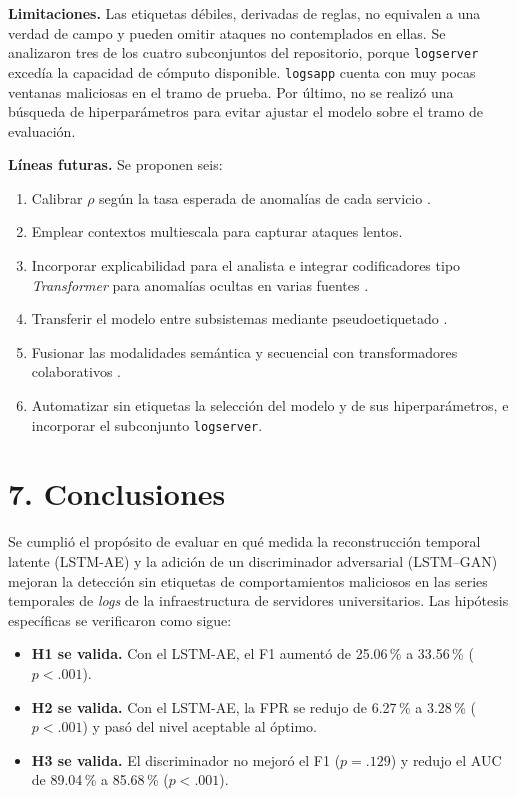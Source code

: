 \documentclass[jou,a4paper,floatsintext,donotrepeattitle]{apa7}
\begin{document}
\textbf{Limitaciones.} Las etiquetas débiles, derivadas de reglas, no equivalen a una verdad de campo y pueden omitir ataques no contemplados en ellas. Se analizaron tres de los cuatro subconjuntos del repositorio, porque \texttt{logserver} excedía la capacidad de cómputo disponible. \texttt{logsapp} cuenta con muy pocas ventanas maliciosas en el tramo de prueba. Por último, no se realizó una búsqueda de hiperparámetros para evitar ajustar el modelo sobre el tramo de evaluación.

\textbf{Líneas futuras.} Se proponen seis:
\begin{enumerate}
  \item Calibrar $\rho$ según la tasa esperada de anomalías de cada servicio \parencite{qian2025,yokkampon2022}.
  \item Emplear contextos multiescala para capturar ataques lentos.
  \item Incorporar explicabilidad para el analista e integrar codificadores tipo \textit{Transformer} para anomalías ocultas en varias fuentes \parencite{luo2025}.
  \item Transferir el modelo entre subsistemas mediante pseudoetiquetado \parencite{zhao2025}.
  \item Fusionar las modalidades semántica y secuencial con transformadores colaborativos \parencite{nasirzadeh2025}.
  \item Automatizar sin etiquetas la selección del modelo y de sus hiperparámetros, e incorporar el subconjunto \texttt{logserver}.
\end{enumerate}

\section{7. Conclusiones}
Se cumplió el propósito de evaluar en qué medida la reconstrucción temporal latente (LSTM-AE) y la adición de un discriminador adversarial (LSTM--GAN) mejoran la detección sin etiquetas de comportamientos maliciosos en las series temporales de \textit{logs} de la infraestructura de servidores universitarios. Las hipótesis específicas se verificaron como sigue:

\begin{itemize}
  \item \textbf{H1 se valida.} Con el LSTM-AE, el F1 aumentó de 25.06\,\% a 33.56\,\% ($p < .001$).
  \item \textbf{H2 se valida.} Con el LSTM-AE, la FPR se redujo de 6.27\,\% a 3.28\,\% ($p < .001$) y pasó del nivel aceptable al óptimo.
  \item \textbf{H3 se valida.} El discriminador no mejoró el F1 ($p = .129$) y redujo el AUC de 89.04\,\% a 85.68\,\% ($p < .001$).
\end{itemize}
\end{document}
